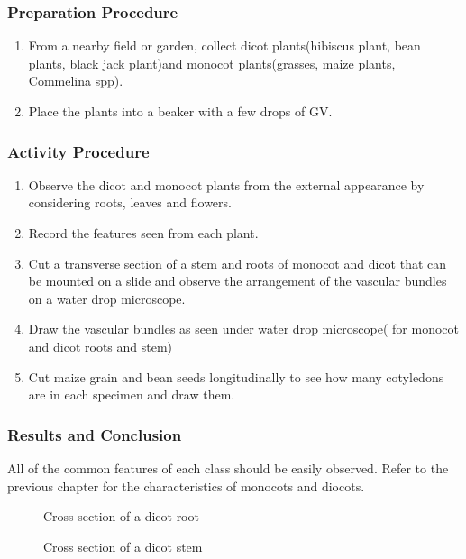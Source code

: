 \subsubsection*{Preparation Procedure}
\begin{enumerate}
\item{From a nearby field or garden, collect dicot plants(hibiscus plant, bean plants, black jack plant)and monocot plants(grasses, maize plants, Commelina spp).}
\item{Place the plants into a beaker with a few drops of GV.}
\end{enumerate}

\subsubsection*{Activity Procedure}
\begin{enumerate}
\item{Observe the dicot and monocot plants from the external appearance by considering roots, leaves and flowers.}
\item{Record the features seen from each plant.}
\item{Cut a transverse section of a stem and roots of monocot and dicot that can be mounted on a slide and observe the arrangement of the vascular bundles on a water drop microscope.}
\item{Draw the vascular bundles as seen under water drop microscope( for monocot and dicot roots and stem)}
\item{Cut maize grain and bean seeds longitudinally to see how many cotyledons are in each specimen and draw them.}
\end{enumerate}

\subsubsection*{Results and Conclusion}
All of the common features of each class should be easily observed. Refer to the previous chapter for the characteristics of monocots and diocots.
\begin{figure}[h]
\begin{center}
\def\svgwidth{6cm}

\caption{Cross section of a dicot root}
\label{fig:diroot}
\end{center}
\end{figure}

\begin{figure}[h]
\begin{center}
\def\svgwidth{6cm}

\caption{Cross section of a dicot stem}
\label{fig:fish}
\end{center}
\end{figure}

